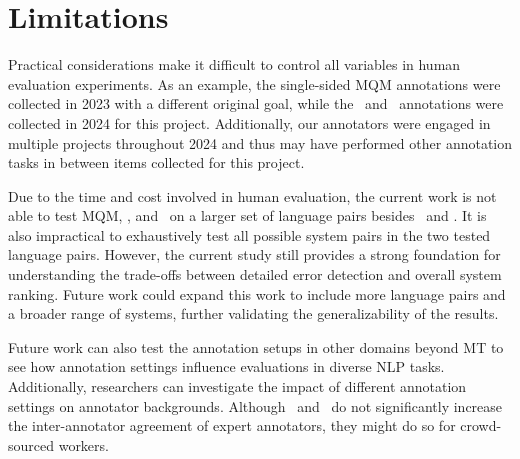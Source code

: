 \section*{Limitations}

Practical considerations make it difficult to control all variables in human evaluation experiments. As an example, the single-sided MQM annotations were collected in 2023 with a different original goal, while the \sxsmqm~and \sxsqr~annotations were collected in 2024 for this project. Additionally, our annotators were engaged in multiple projects throughout 2024 and thus may have performed other annotation tasks in between items collected for this project.

Due to the time and cost involved in human evaluation, the current work is not able to test MQM, \sxsmqm, and \sxsqr~on a larger set of language pairs besides \ZhEn~and \EnDe. It is also impractical to exhaustively test all possible system pairs in the two tested language pairs. However, the current study still provides a strong foundation for understanding the trade-offs between detailed error detection and overall system ranking. Future work could expand this work to include more language pairs and a broader range of systems, further validating the generalizability of the results.

Future work can also test the annotation setups in other domains beyond MT to see how annotation settings influence evaluations in diverse NLP tasks. Additionally, researchers can investigate the impact of different annotation settings on annotator backgrounds. Although \sxsmqm~and \sxsqr~do not significantly increase the inter-annotator agreement of expert annotators, they might do so for crowd-sourced workers.

